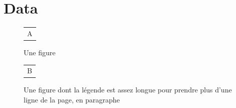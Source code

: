 \documentclass{article}
\begin{document}
\section{Data}
\begin{figure}[h]
\centering
\begin{tabular}{c}A\end{tabular}
\caption{Une figure}
\end{figure}
\begin{figure}[h]
\centering
\begin{tabular}{c}B\end{tabular}
\caption{Une figure dont la l\'egende est assez longue pour prendre plus d'une ligne de la page, en paragraphe}
\end{figure}
\end{document}
